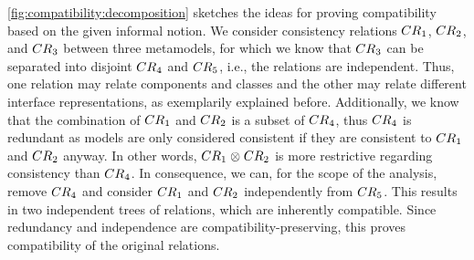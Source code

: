 \autoref{fig:compatibility:decomposition} sketches the ideas for proving compatibility based on the given informal notion.
We consider consistency relations $\consistencyrelation{CR}{1}$, $\consistencyrelation{CR}{2}$, and $\consistencyrelation{CR}{3}$ between three metamodels, for which we know that $\consistencyrelation{CR}{3}$ can be separated into disjoint $\consistencyrelation{CR}{4}$ and $\consistencyrelation{CR}{5}$, i.e., the relations are independent.
Thus, one relation may relate components and classes and the other may relate different interface representations, as exemplarily explained before.
Additionally, we know that the combination of $\consistencyrelation{CR}{1}$ and $\consistencyrelation{CR}{2}$ is a subset of $\consistencyrelation{CR}{4}$, thus $\consistencyrelation{CR}{4}$ is redundant as models are only considered consistent if they are consistent to $\consistencyrelation{CR}{1}$ and $\consistencyrelation{CR}{2}$ anyway.
In other words, $\consistencyrelation{CR}{1} \concat \consistencyrelation{CR}{2}$ is more restrictive regarding consistency than $\consistencyrelation{CR}{4}$.
In consequence, we can, for the scope of the analysis, remove $\consistencyrelation{CR}{4}$ and consider $\consistencyrelation{CR}{1}$ and $\consistencyrelation{CR}{2}$ independently from $\consistencyrelation{CR}{5}$.
This results in two independent trees of relations, which are inherently compatible.
Since redundancy and independence are compatibility-preserving, this proves compatibility of the original relations.



